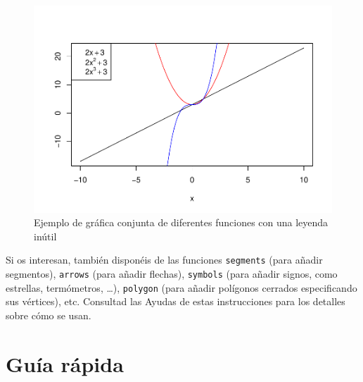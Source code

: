 \documentclass[
]{book}
\theoremstyle{definition}
\theoremstyle{definition}
\theoremstyle{definition}
\theoremstyle{remark}
\begin{document}
\begin{figure}

{\centering \includegraphics[width=0.9\linewidth]{07chap06_Graficos_I_files/figure-latex/caca-1} 

}

\caption{Ejemplo de gráfica conjunta de diferentes funciones con una leyenda inútil}\label{fig:caca}
\end{figure}

Si os interesan, también disponéis de las funciones \texttt{segments} (para
añadir segmentos), \texttt{arrows} (para añadir flechas), \texttt{symbols}
(para añadir signos, como estrellas, termómetros, \ldots), \texttt{polygon}
(para añadir polígonos cerrados especificando sus vértices), etc.
Consultad las Ayudas de estas instrucciones para los detalles sobre cómo se
usan.

\hypertarget{guuxeda-ruxe1pida-3}{%
\section{Guía rápida}\label{guuxeda-ruxe1pida-3}}
\end{document}

